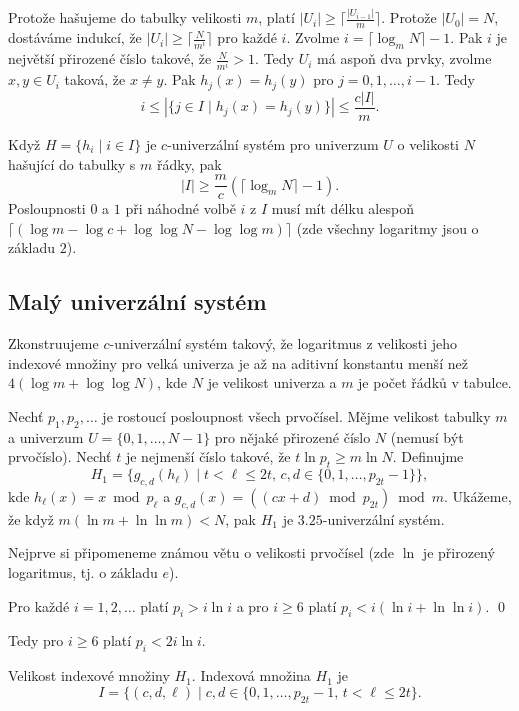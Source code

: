 \documentclass[a4paper,12pt]{article}
\begin{document}
Protože hašujeme do tabulky velikosti $m$, platí 
$|U_i|\ge\lceil\frac {|U_{i-1}|}m\rceil$. Protože $|U_0|=N$, dostáváme indukcí, že 
$|U_i|\ge\lceil\frac N{m^i}\rceil$ pro každé $i$. Zvolme $i=
\lceil\log_mN\rceil -1$. Pak $i$ je 
největší přirozené číslo takové, že $\frac 
N{m^i}>1$. Tedy $U_i$ má 
aspoň dva prvky, zvolme $x,y\in U_i$ taková, že $x\ne y$. Pak 
$h_j(x)=h_j(y)$ pro $j=0,1,\dots,i-1$. Tedy 
$$i\le |\{j\in I\mid h_j(x)=h_j(y)\}|\le\frac {c|I|}m.$$

Když $H=\{h_i\mid i\in I\}$ je $c$-univerzální systém pro 
univerzum $U$ o velikosti $N$ hašující do tabulky s $m$ řádky, pak 
$$|I|\ge\frac mc(\lceil\log_mN\rceil -1).$$
Posloupnosti $0$ a $1$ při náhodné volbě $i$ z $I$ musí mít 
délku alespoň $\lceil (\log m-\log c+\log\log N-\log\log m)\rceil$ (zde všechny logaritmy 
jsou o základu $2$).
\endproclaim

\subsection{
Malý univerzální systém
}

Zkonstruujeme $c$-univerzální systém takový, 
že logaritmus z velikosti jeho indexové množiny pro velká 
univerza je až na aditivní konstantu menší než 
$4(\log m+\log\log N)$, kde $N$ je velikost univerza a $m$ je počet 
řádků v tabulce.  

Nechť $p_1,p_2,\dots$ je rostoucí posloupnost všech 
prvočísel. Měj\-me velikost tabulky $m$ a univerzum $U=
\{0,1,\dots,N-1\}$ pro 
nějaké přirozené číslo $N$ (nemusí být prvočíslo). Nechť $
t$ je 
nejmenší číslo takové, že $t\ln p_t\ge m\ln N$. Definujme 
$$H_1=\{g_{c,d}(h_{\ell})\mid t<\ell\le 2t,\,c,d\in \{0,1,\dots,p_{
2t}-1\}\},$$
kde $h_{\ell}(x)=x\bmod p_{\ell}$ a 
$g_{c,d}(x)=((cx+d)\bmod p_{2t})\bmod m$.\newline 
Ukážeme, že když $m(\ln m+\ln\ln m)<N$, pak $H_1$ je $
3.25$-univerzální systém. 

Nejprve si připomeneme známou větu o velikosti prvočísel 
(zde $\ln$ je přirozený logaritmus, tj. o základu $e$).

Pro každé $i=1,2,\dots$ platí $p_i>i\ln 
i$ a pro $i\ge 6$ 
platí $p_i<i(\ln i+\ln\ln i)$. \qed
\endproclaim

Tedy pro $i\ge 6$ platí $p_i<2i\ln i$.

Velikost indexové množiny $H_1$.  Indexová množina $
H_1$ je 
$$I=\{(c,d,\ell )\mid c,d\in \{0,1,\dots,p_{2t}-1,\,t<\ell\le 2t\}
.$$
  
\end{document}
